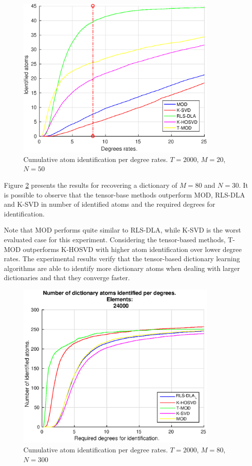 \begin{figure}[!htb]
	\centering 
	\includegraphics[width=10cm]{figures/ch4/s=5_snr=20_L=2000_noIt=100_N=20_K=50.eps}
	\caption{Cumulative atom identification per degree rates. $T=2000$, $M=20$, $N=50$}
	\label{fig:fig1}
\end{figure}

Figure \ref{fig:fig2} presents the results for recovering a dictionary of $M=80$ and $N=30$. It is possible to observe that the tensor-base methods outperform MOD, RLS-DLA and K-SVD in number of identified atoms and the required degrees for identification. 

Note that MOD performs quite similar to RLS-DLA, while K-SVD is the worst evaluated case for this experiment. Considering the tensor-based methods, T-MOD outperforms K-HOSVD with higher atom identification over lower degree rates. The experimental results verify that the tensor-based dictionary learning algorithms are able to identify more dictionary atoms when dealing with larger dictionaries and that they converge faster.

\begin{figure}[!htb]
	\centering 
	\includegraphics[width=10cm]{figures/ch4/5_20_2000_24000_100.eps}
	\caption{Cumulative atom identification per degree rates. $T=2000$, $M=80$, $N=300$}
	\label{fig:fig2}
\end{figure}

